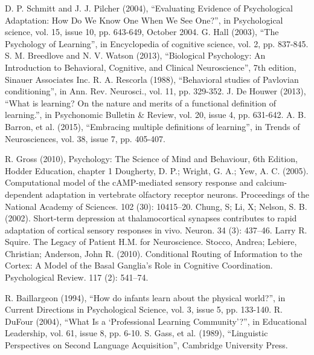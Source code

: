 \documentclass[conference]{IEEEtran}
\begin{document}
\begin{thebibliography}{00}

 D. P. Schmitt and J. J. Pilcher (2004), “Evaluating Evidence of Psychological Adaptation: How Do We Know One When We See One?”, in Psychological science, vol. 15, issue 10, pp. 643-649, October 2004.
 G. Hall (2003), “The Psychology of Learning”, in Encyclopedia of cognitive science, vol. 2, pp. 837-845.
 S. M. Breedlove and N. V. Watson (2013), “Biological Psychology: An Introduction to Behavioral, Cognitive, and Clinical Neuroscience”, 7th edition, Sinauer Associates Inc.
 R. A. Rescorla (1988), “Behavioral studies of Pavlovian conditioning”, in Ann. Rev. Neurosci., vol. 11, pp. 329-352.
 J. De Houwer (2013), “What is learning? On the nature and merits of a functional definition of learning.”, in Psychonomic Bulletin \& Review, vol. 20, issue 4, pp. 631-642.
 A. B. Barron, et al. (2015), “Embracing multiple definitions of learning”, in Trends of Neurosciences, vol. 38, issue 7, pp. 405-407.

 R. Gross (2010), Psychology: The Science of Mind and Behaviour, 6th Edition, Hodder Education, chapter 1
 Dougherty, D. P.; Wright, G. A.; Yew, A. C. (2005). Computational model of the cAMP-mediated sensory response and calcium-dependent adaptation in vertebrate olfactory receptor neurons. Proceedings of the National Academy of Sciences. 102 (30): 10415–20.
 Chung, S; Li, X; Nelson, S. B. (2002). Short-term depression at thalamocortical synapses contributes to rapid adaptation of cortical sensory responses in vivo. Neuron. 34 (3): 437–46.
 Larry R. Squire. The Legacy of Patient H.M. for Neuroscience.
 Stocco, Andrea; Lebiere, Christian; Anderson, John R. (2010). Conditional Routing of Information to the Cortex: A Model of the Basal Ganglia's Role in Cognitive Coordination. Psychological Review. 117 (2): 541–74.

 R. Baillargeon (1994), “How do infants learn about the physical world?”, in Current Directions in Psychological Science, vol. 3, issue 5, pp. 133-140.
 R. DuFour (2004), “What Is a ‘Professional Learning Community’?”, in Educational Leadership, vol. 61, issue 8, pp. 6-10.
 S. Gass, et al. (1989), “Linguistic Perspectives on Second Language Acquisition”, Cambridge University Press.





\end{thebibliography}
\vspace{12pt}
\end{document}
